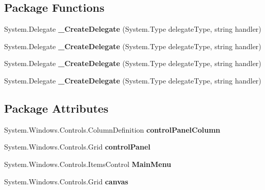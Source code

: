 \subsection*{Package Functions}
\begin{DoxyCompactItemize}
\item 
\mbox{\label{class_teacher_handbook_1_1_main_window_a2cd23d6759ae818c7db481b1efb4bfbd}} 
System.\+Delegate {\bfseries \+\_\+\+Create\+Delegate} (System.\+Type delegate\+Type, string handler)
\item 
\mbox{\label{class_teacher_handbook_1_1_main_window_a2cd23d6759ae818c7db481b1efb4bfbd}} 
System.\+Delegate {\bfseries \+\_\+\+Create\+Delegate} (System.\+Type delegate\+Type, string handler)
\item 
\mbox{\label{class_teacher_handbook_1_1_main_window_a2cd23d6759ae818c7db481b1efb4bfbd}} 
System.\+Delegate {\bfseries \+\_\+\+Create\+Delegate} (System.\+Type delegate\+Type, string handler)
\item 
\mbox{\label{class_teacher_handbook_1_1_main_window_a2cd23d6759ae818c7db481b1efb4bfbd}} 
System.\+Delegate {\bfseries \+\_\+\+Create\+Delegate} (System.\+Type delegate\+Type, string handler)
\end{DoxyCompactItemize}
\subsection*{Package Attributes}
\begin{DoxyCompactItemize}
\item 
\mbox{\label{class_teacher_handbook_1_1_main_window_ac36bb4fc2ccf9ed61ea2705b75aabc15}} 
System.\+Windows.\+Controls.\+Column\+Definition {\bfseries control\+Panel\+Column}
\item 
\mbox{\label{class_teacher_handbook_1_1_main_window_a39fb37d144a6d9efc57fc17b78321a1a}} 
System.\+Windows.\+Controls.\+Grid {\bfseries control\+Panel}
\item 
\mbox{\label{class_teacher_handbook_1_1_main_window_a83a05dbd21ff62a1bb244c1e83c5be54}} 
System.\+Windows.\+Controls.\+Items\+Control {\bfseries Main\+Menu}
\item 
\mbox{\label{class_teacher_handbook_1_1_main_window_a02d103e0b780385b00acf5494c63496a}} 
System.\+Windows.\+Controls.\+Grid {\bfseries canvas}
\end{DoxyCompactItemize}
